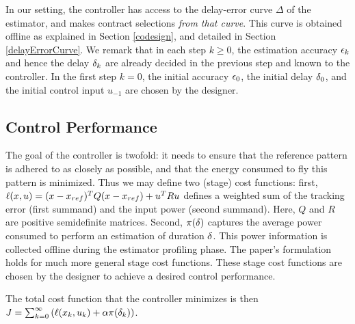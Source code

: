In our setting, the controller has access to the delay-error curve $\Delta$ of the estimator, and makes contract selections \emph{from that curve}.
This curve is obtained offline as explained in Section \ref{codesign}, and detailed in Section \ref{delayErrorCurve}.
We remark that in each step $k\geq0$, the estimation accuracy $\epsilon_k$
and hence the delay $\delta_k$ are already decided in the previous
step and known to the controller.
In the first step $k=0$, the
initial accuracy $\epsilon_0$, the initial delay $\delta_0$, and
the initial control input $u_{-1}$ are chosen by the designer.

\subsection{Control Performance}
The goal of the controller is twofold: it needs to ensure that the reference pattern is adhered to as closely as possible, and that the energy consumed to fly this pattern is minimized.
Thus we may define two (stage) cost functions: first, $\ell(x, u) = (x - x_{ref})^TQ(x - x_{ref}) + u^T R u$ defines a weighted sum of the tracking error (first summand) and the input power (second summand).
Here, $Q$ and $R$ are positive semidefinite matrices.
Second, $\pi(\delta)$ captures the average power consumed to perform an estimation of duration $\delta$.
This power information is collected offline during the estimator profiling phase.
The paper's formulation holds for much more general stage cost functions.
These stage cost functions are chosen by the designer to achieve a desired control performance.

The total cost function that the controller minimizes is then
\(
J=\sum_{k=0}^{\infty}\left(\ell(x_k,u_k)+ \alpha \pi(\delta_k)\right)
\).

